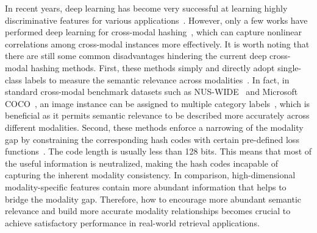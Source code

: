 \documentclass[10pt,twocolumn,letterpaper]{article}
\begin{document}
\vspace{-0.05cm}
In recent years, deep learning has become very successful at learning highly discriminative features for various applications~\cite{bengio2013representation}\cite{krizhevsky2012imagenet}. However, only a few works have performed deep learning for cross-modal hashing~\cite{Cao2016Deep, Liong2017ICCV, Jiang2017CVPR, Shen2017ICCV, yang2017pairwise}, which can capture nonlinear correlations among cross-modal instances more effectively. It is worth noting that there are still some common disadvantages hindering the current deep cross-modal hashing methods. First, these methods simply and directly adopt single-class labels to measure the semantic relevance across modalities~\cite{Liong2017ICCV}\cite{Jiang2017CVPR}. In fact, in standard cross-modal benchmark datasets such as NUS-WIDE~\cite{chua2009nus} and Microsoft COCO~\cite{lin2014microsoft}, an image instance can be assigned to multiple category labels~\cite{Ranjan2015ICCV}, which is beneficial as it permits semantic relevance to be described more accurately across different modalities. Second, these methods enforce a narrowing of the modality gap by constraining the corresponding hash codes with certain pre-defined loss functions~\cite{Cao2016Correlation}. The code length is usually less than 128 bits. This means that most of the useful information is neutralized, making the hash codes incapable of capturing the inherent modality consistency. In comparison, high-dimensional modality-specific features contain more abundant information that helps to bridge the modality gap. Therefore, how to encourage more abundant semantic relevance and build more accurate modality relationships becomes crucial to achieve satisfactory performance in real-world retrieval applications.
\end{document}
